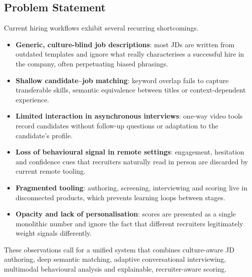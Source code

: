 \subsection{Problem Statement}
Current hiring workflows exhibit several recurring shortcomings.
\begin{itemize}
    \item \textbf{Generic, culture-blind job descriptions}: most JDs are
    written from outdated templates and ignore what really characterises a
    successful hire in the company, often perpetuating biased phrasings.
    \item \textbf{Shallow candidate--job matching}: keyword overlap fails to
    capture transferable skills, semantic equivalence between titles or
    context-dependent experience.
    \item \textbf{Limited interaction in asynchronous interviews}: one-way
    video tools record candidates without follow-up questions or adaptation
    to the candidate's profile.
    \item \textbf{Loss of behavioural signal in remote settings}: engagement,
    hesitation and confidence cues that recruiters naturally read in person
    are discarded by current remote tooling.
    \item \textbf{Fragmented tooling}: authoring, screening, interviewing and
    scoring live in disconnected products, which prevents learning loops
    between stages.
    \item \textbf{Opacity and lack of personalisation}: scores are presented
    as a single monolithic number and ignore the fact that different
    recruiters legitimately weight signals differently.
\end{itemize}
These observations call for a unified system that combines culture-aware JD
authoring, deep semantic matching, adaptive conversational interviewing,
multimodal behavioural analysis and explainable, recruiter-aware scoring.

